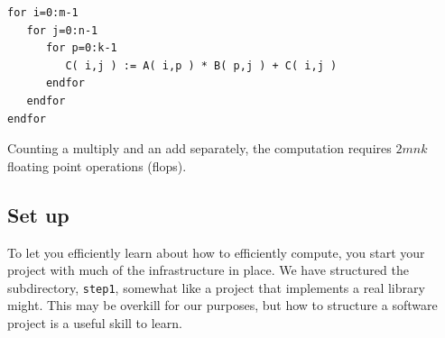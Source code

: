 \vspace{0.1in}
\begin{center}
\begin{minipage}{4in}
\begin{verbatim}
for i=0:m-1
   for j=0:n-1
      for p=0:k-1
         C( i,j ) := A( i,p ) * B( p,j ) + C( i,j )
      endfor
   endfor
endfor
\end{verbatim}
\end{minipage}
\end{center}
\vspace{0.1in}
Counting a multiply and an add separately,
the computation requires $ 2 m n k $  floating point operations (flops).

\subsection{Set up}

To let you efficiently learn about how to efficiently compute, you
start your project with much of the infrastructure in place.  We have
structured the subdirectory, {\tt step1}, somewhat like a project that
implements a real library might.   This may be overkill for our
purposes, but how to structure a software project is a useful skill to learn.


